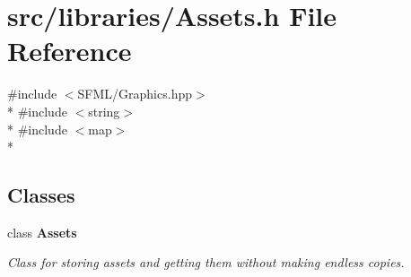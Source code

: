 \section{src/libraries/\-Assets.h File Reference}
\label{_assets_8h}
{\ttfamily \#include $<$S\-F\-M\-L/\-Graphics.\-hpp$>$}\\*
{\ttfamily \#include $<$string$>$}\\*
{\ttfamily \#include $<$map$>$}\\*
\subsection*{Classes}
\begin{DoxyCompactItemize}
\item 
class {\bf Assets}
\begin{DoxyCompactList}\small\item\em Class for storing assets and getting them without making endless copies. \end{DoxyCompactList}\end{DoxyCompactItemize}

